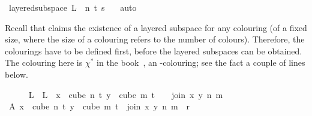 \begin{isabellebody}
\ {\isacartoucheopen}layered{\isacharunderscore}{\kern0pt}subspace\ L\ {}\ n\ t\ s\ {\isasymchi}{\isacartoucheclose}\ \isamarkupfalse%
\ auto\isanewline
\ \ \ \ \isamarkupfalse%
%
\endisatagproof
{\isafoldproof}%
%
\isadelimproof
%
\endisadelimproof
%
\isadelimdocument
%
\endisadelimdocument
%
\isatagdocument
%
\isamarkuptrue%
%
\begin{isamarkuptext}%
Recall that  claims the existence of a layered subspace for any colouring (of a fixed size, where the size of a colouring refers to the number of colours). Therefore, the colourings have to be defined first, before the layered subspaces can be obtained. The colouring  here is $\chi^*$ in the book~\cite{thebook}, an -colouring; see the fact  a couple of lines below.%
\end{isamarkuptext}\isamarkuptrue%
%
\endisatagdocument
{\isafolddocument}%
%
\isadelimdocument
%
\endisadelimdocument
%
\isadelimproof
\ \ \ \ %
\endisadelimproof
%
\isatagproof
{}\isamarkupfalse%
\ {\isasymchi}L\ \ {\isachardoublequoteopen}{\isasymchi}L\ {\isasymequiv}\ {\isacharparenleft}{\kern0pt}{\isasymlambda}x\ {\isasymin}\ cube\ n\ {\isacharparenleft}{\kern0pt}t{\isacharplus}{\kern0pt}{}{\isacharparenright}{\kern0pt}{\isachardot}{\kern0pt}\ {\isacharparenleft}{\kern0pt}{\isasymlambda}y\ {\isasymin}\ cube\ m\ {\isacharparenleft}{\kern0pt}t\ {\isacharplus}{\kern0pt}\ {}{\isacharparenright}{\kern0pt}{\isachardot}{\kern0pt}\ {\isasymchi}\ {\isacharparenleft}{\kern0pt}join\ x\ y\ n\ m{\isacharparenright}{\kern0pt}{\isacharparenright}{\kern0pt}{\isacharparenright}{\kern0pt}{\isachardoublequoteclose}\isanewline
\ \ \ \ \isamarkupfalse%
\ A{\isacharcolon}{\kern0pt}\ {\isachardoublequoteopen}{\isasymforall}x\ {\isasymin}\ cube\ n\ {\isacharparenleft}{\kern0pt}t{\isacharplus}{\kern0pt}{}{\isacharparenright}{\kern0pt}{\isachardot}{\kern0pt}\ {\isasymforall}y\ {\isasymin}\ cube\ m\ {\isacharparenleft}{\kern0pt}t{\isacharplus}{\kern0pt}{}{\isacharparenright}{\kern0pt}{\isachardot}{\kern0pt}\ {\isasymchi}\ {\isacharparenleft}{\kern0pt}join\ x\ y\ n\ m{\isacharparenright}{\kern0pt}\ {\isasymin}\ {\isacharbraceleft}{\kern0pt}{\isachardot}{\kern0pt}{\isachardot}{\kern0pt}{\isacharless}{\kern0pt}r{\isacharbraceright}{\kern0pt}{\isachardoublequoteclose}\isanewline

\end{isabellebody}
